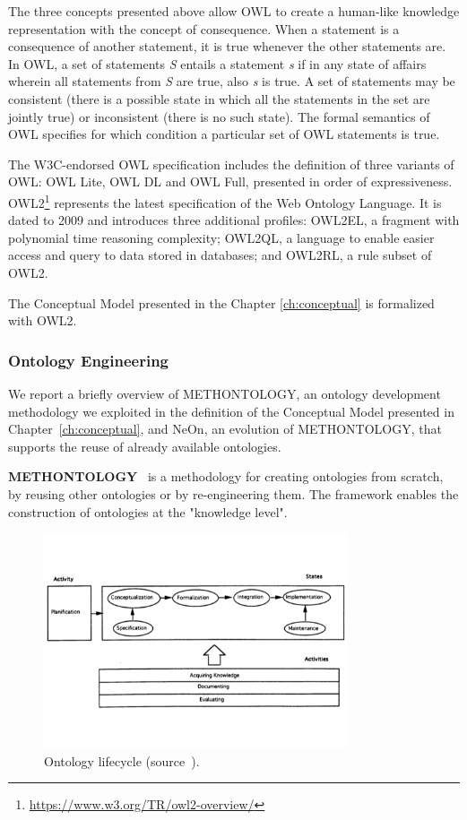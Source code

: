 The three concepts presented above allow OWL to create a human-like knowledge representation with the concept of consequence. When a statement is a consequence of another statement, it is true whenever the other statements are. In OWL, a set of statements \textit{S} entails a statement \textit{s} if in any state of affairs wherein all statements from \textit{S} are true, also \textit{s} is true. A set of statements may be consistent (there is a possible state in which all the statements in the set are jointly true) or inconsistent (there is no such state). The formal semantics of OWL specifies for which condition a particular set of OWL statements is true.

The W3C-endorsed OWL specification includes the definition of three variants of OWL: OWL Lite, OWL DL and OWL Full, presented in order of expressiveness.
OWL2\footnote{\url{https://www.w3.org/TR/owl2-overview/}} represents the latest specification of the  Web Ontology Language. It is dated to 2009 and introduces three additional profiles: OWL2EL, a fragment with polynomial time reasoning complexity; OWL2QL, a language to enable easier access and query to data stored in databases; and OWL2RL, a rule subset of OWL2.

The Conceptual Model presented in the Chapter \ref{ch:conceptual} is formalized with OWL2.

\subsubsection{Ontology Engineering}\label{sec:onto-eng}
We report a briefly overview of METHONTOLOGY, an ontology development methodology we exploited in the definition of the Conceptual Model presented in Chapter~\ref{ch:conceptual}, and NeOn, an evolution of METHONTOLOGY, that supports the reuse of already available ontologies.

\textbf{METHONTOLOGY}~\cite{fernandez1997methontology} is a methodology for creating ontologies from scratch, by reusing other ontologies or by re-engineering them. The framework enables the construction of ontologies at the "knowledge level". 

\begin{figure}[h]
  \begin{center}
    \includegraphics[width=0.8\textwidth]{img/methontology}
    \caption{Ontology lifecycle (source~\cite{fernandez1997methontology}).}
    \label{fig:methontology}
  \end{center}
\end{figure}

